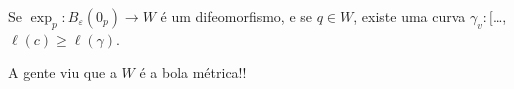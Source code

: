 \begin{coro}\leavevmode
Se \(\operatorname{exp}_p:B_\varepsilon(0_p) \to W\) é um difeomorfismo, e se \(q \in W\), existe uma curva \(\gamma_v:[\)…, \(\ell(c) \geq  \ell(\gamma)\).
\end{coro}

\begin{upshot}\leavevmode
A gente viu que a \(W\) é a bola métrica!!
\end{upshot}


\clearpage
